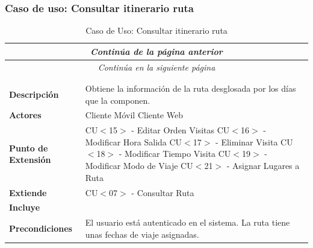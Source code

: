 \subsubsection*{Caso de uso: Consultar itinerario ruta }
\begin{longtable}{| p{4cm} | p{10cm} |}
\endfirsthead
\multicolumn{2}{c}{\textit{Continúa de la página anterior}}\\[12pt]
\hline
\endhead
\hline
\multicolumn{2}{c}{\textit{Continúa en la siguiente página}} \\
\endfoot
\hline
\caption{Caso de Uso: Consultar itinerario ruta}\label{fig:1}\\
\endlastfoot


\hline
\multicolumn{2}{|c|}{\textbf{CU$<$14$>$ - Consultar Itinerario Ruta}} \\

\hline
\textbf{Descripción} &
Obtiene la información de la ruta desglosada por los días que la componen.\\

\hline
\textbf{Actores} &
Cliente Móvil\newline
Cliente Web\\

\hline
\textbf{Punto de Extensión} &
CU$<$15$>$ - Editar Orden Visitas\newline
CU$<$16$>$ - Modificar Hora Salida\newline
CU$<$17$>$ - Eliminar Visita\newline
CU$<$18$>$ - Modificar Tiempo Visita\newline
CU$<$19$>$ - Modificar Modo de Viaje\newline
CU$<$21$>$ - Asignar Lugares a Ruta
\\

\hline
\textbf{Extiende} &
CU$<$07$>$ - Consultar Ruta
\\

\hline
\textbf{Incluye} &
\\

\hline
\textbf{Precondiciones} &
El usuario está autenticado en el sistema.\newline
La ruta tiene unas fechas de viaje asignadas.\\


\end{longtable}
